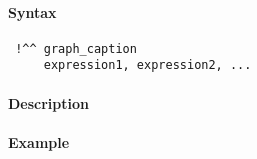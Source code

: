 


	\paragraph{Syntax}
 
 \begin{verbatim}
 !^^ graph_caption
     expression1, expression2, ...
 \end{verbatim}
 
 \paragraph{Description}
 
 \paragraph{Example}


